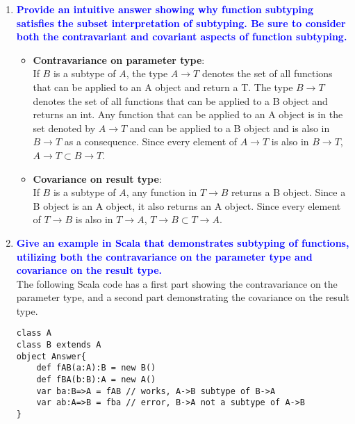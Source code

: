 \documentclass[10pt]{article}
\begin{document}
\begin{enumerate}
\begin{enumerate}
            
        \item \textbf{\textcolor{blue}{Provide an intuitive answer showing why function subtyping satisfies the subset interpretation of subtyping. Be sure to consider both the contravariant and covariant aspects of function subtyping.}}
            \begin{itemize}
                \item \textbf{Contravariance on parameter type}: 
                \\ If $B$ is a subtype of $A$, the type $A \rightarrow T$ denotes the set of all functions that can be applied to an A object and return a T. The type $B \rightarrow T$ denotes the set of all functions that can be applied to a B object and returns an int. Any function that can be applied to an A object is in the set denoted by $A \rightarrow T$ and can be applied to a B object and is also in $B \rightarrow T$ as a consequence. Since every element of $A \rightarrow T$ is also in $B \rightarrow T$, $A \rightarrow T \subset B \rightarrow T$.
                \item \textbf{Covariance on result type}: 
                \\ If $B$ is a subtype of $A$, any function in $T \rightarrow B$ returns a B object. Since a B object is an A object, it also returns an A object. Since every element of $T \rightarrow B$ is also in $T \rightarrow A$, $T \rightarrow B \subset T \rightarrow A$.
            \end{itemize}
        \item \textbf{\textcolor{blue}{Give an example in Scala that demonstrates subtyping of functions, utilizing both the contravariance on the parameter type and covariance on the result type.}}
        \\ The following Scala code has a first part showing the contravariance on the parameter type, and a second part demonstrating the covariance on the result type. \\
            \begin{verbatim}
class A
class B extends A
object Answer{
    def fAB(a:A):B = new B()
    def fBA(b:B):A = new A()
    var ba:B=>A = fAB // works, A->B subtype of B->A
    var ab:A=>B = fba // error, B->A not a subtype of A->B
}
            \end{verbatim}        
    \end{enumerate}
    

\end{enumerate}
\end{document}
